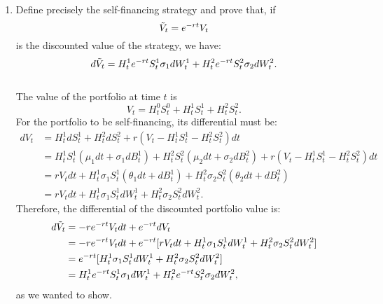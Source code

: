 \documentclass[11pt,a4,table]{article}
\begin{document}
\begin{enumerate}
\begin{enumerate}
        \item Define precisely the self-financing strategy and prove that, if
        \begin{equation*}
            \Tilde{V}_t = e^{-rt} V_t
        \end{equation*}
        is the discounted value of the strategy, we have:
        \begin{equation}
            d\Tilde{V}_t = H_t^1 e^{-rt} S_t^1\sigma_1 dW_t^1 + H_t^2 e^{-rt} S_t^2 \sigma_2 dW_t^2.
        \end{equation}\\
        The value of the portfolio at time $t$ is
        \begin{equation*}
            V_t = H_t^0S_t^0 + H_t^1S_t^1 + H_t^2S_t^2.
        \end{equation*}
        For the portfolio to be self-financing, its differential must be:
        \begin{align*}
            dV_t &= H_t^1 dS_t^1 + H_t^2 dS_t^2 + r(V_t - H_t^1S_t^1 - H_t^2S_t^2) dt\\
            &= H_t^1S_t^1(\mu_1 dt + \sigma_1 dB_t^1) + H_t^2S_t^2(\mu_2 dt + \sigma_2 dB_t^2) + r(V_t - H_t^1S_t^1 - H_t^2S_t^2) dt\\
            &= rV_t dt + H_t^1\sigma_1S_t^1(\theta_1 dt + dB_t^1) + H_t^2\sigma_2S_t^2(\theta_2 dt + dB_t^2)\\
            &= rV_t dt + H_t^1\sigma_1S_t^1 dW_t^1 + H_t^2\sigma_2S_t^2 dW_t^2.
        \end{align*}
        Therefore, the differential of the discounted portfolio value is:
        \begin{align*}
            d\Tilde{V}_t &= -re^{-rt}V_t dt + e^{-rt} dV_t\\
            &= -re^{-rt}V_t dt + e^{-rt}[rV_t dt + H_t^1\sigma_1S_t^1 dW_t^1 + H_t^2\sigma_2S_t^2 dW_t^2]\\
            &= e^{-rt}[H_t^1\sigma_1S_t^1 dW_t^1 + H_t^2\sigma_2S_t^2 dW_t^2]\\
            &= H_t^1e^{-rt}S_t^1\sigma_1 dW_t^1 + H_t^2e^{-rt}S_t^2\sigma_2 dW_t^2,
        \end{align*}
        as we wanted to show.
        

\end{enumerate}
\end{enumerate}
\end{document}
